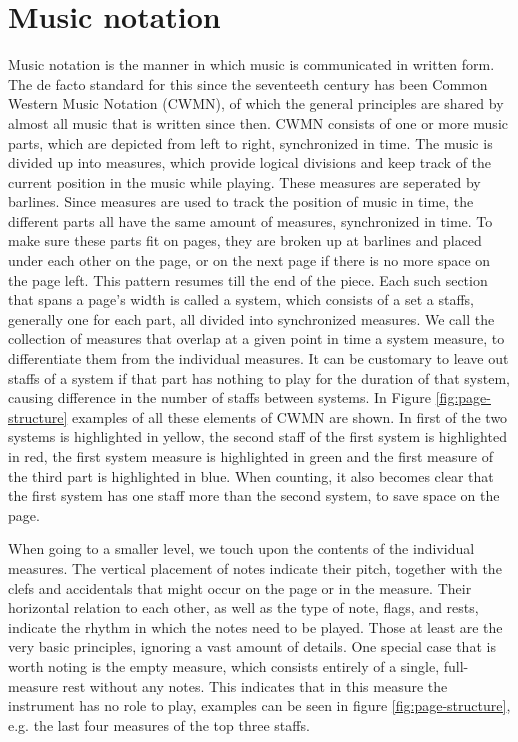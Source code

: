 \section{Music notation}\label{sec:introduction-music-notation}
Music notation is the manner in which music is communicated in written form. The de facto standard for this since the seventeeth century has been Common Western Music Notation (CWMN), of which the general principles are shared by almost all music that is written since then. CWMN consists of one or more music parts, which are depicted from left to right, synchronized in time. The music is divided up into measures, which provide logical divisions and keep track of the current position in the music while playing. These measures are seperated by barlines. Since measures are used to track the position of music in time, the different parts all have the same amount of measures, synchronized in time. To make sure these parts fit on pages, they are broken up at barlines and placed under each other on the page, or on the next page if there is no more space on the page left. This pattern resumes till the end of the piece. Each such section that spans a page's width is called a system, which consists of a set a staffs, generally one for each part, all divided into synchronized measures. We call the collection of measures that overlap at a given point in time a system measure, to differentiate them from the individual measures. It can be customary to leave out staffs of a system if that part has nothing to play for the duration of that system, causing difference in the number of staffs between systems. In Figure \ref{fig:page-structure} examples of all these elements of CWMN are shown. In first of the two systems is highlighted in yellow, the second staff of the first system is highlighted in red, the first system measure is highlighted in green and the first measure of the third part is highlighted in blue. When counting, it also becomes clear that the first system has one staff more than the second system, to save space on the page.

When going to a smaller level, we touch upon the contents of the individual measures. The vertical placement of notes indicate their pitch, together with the clefs and accidentals that might occur on the page or in the measure. Their horizontal relation to each other, as well as the type of note, flags, and rests, indicate the rhythm in which the notes need to be played. Those at least are the very basic principles, ignoring a vast amount of details. One special case that is worth noting is the empty measure, which consists entirely of a single, full-measure rest without any notes. This indicates that in this measure the instrument has no role to play, examples can be seen in figure \ref{fig:page-structure}, e.g. the last four measures of the top three staffs. 

